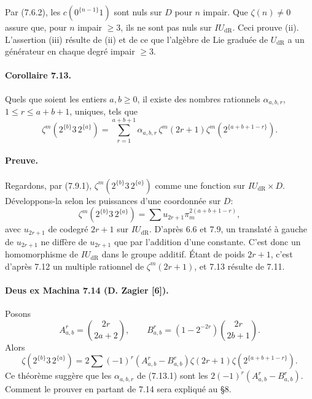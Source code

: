 \documentclass[10pt]{article}
\newcommand{\dR}{\mathrm{dR}}
\begin{document}
Par (7.6.2), les $c(0^{\{n-1\}}1)$ sont nuls sur $D$ pour $n$ impair. Que $\zeta(n)\ne0$ assure que, pour $n$ impair $\geq3$, ils ne sont pas nuls sur $IU_{\dR}$. Ceci prouve (ii). L'assertion (iii) résulte de (ii) et de ce que l'algèbre de Lie graduée de $U_{\dR}$ a un générateur en chaque degré impair $\geq3$.

\paragraph{Corollaire 7.13.}
Quels que soient les entiers $a,b\geq0$, il existe des nombres rationnels $\alpha_{a,b,r}$, $1\leq r\leq a+b+1$, uniques, tels que
\begin{equation}
\zeta^m(2^{\{b\}}3\,2^{\{a\}})=\sum_{r=1}^{a+b+1}\alpha_{a,b,r}\,\zeta^m(2r+1)\zeta^m(2^{\{a+b+1-r\}}).
\tag{7.13.1}
\end{equation}

\paragraph{Preuve.}
Regardons, par (7.9.1), $\zeta^m(2^{\{b\}}3\,2^{\{a\}})$ comme une fonction sur $IU_{\dR}\times D$. Développons-la selon les puissances d'une coordonnée sur $D$:
\[
\zeta^m(2^{\{b\}}3\,2^{\{a\}})=\sum u_{2r+1}\pi_m^{2(a+b+1-r)},
\]
avec $u_{2r+1}$ de codegré $2r+1$ sur $IU_{\dR}$. D'après 6.6 et 7.9, un translaté à gauche de $u_{2r+1}$ ne diffère de $u_{2r+1}$ que par l'addition d'une constante. C'est donc un homomorphisme de $IU_{\dR}$ dans le groupe additif. Étant de poids $2r+1$, c'est d'après 7.12 un multiple rationnel de $\zeta^m(2r+1)$, et 7.13 résulte de 7.11.

\paragraph{Deus ex Machina 7.14 (D. Zagier [6]).}
Posons
\[
A^r_{a,b}=\binom{2r}{2a+2},\qquad
B^r_{a,b}=(1-2^{-2r})\binom{2r}{2b+1}.
\]
Alors
\begin{equation}
\zeta(2^{\{b\}}3\,2^{\{a\}})=2\sum(-1)^r(A^r_{a,b}-B^r_{a,b})\zeta(2r+1)\zeta(2^{\{a+b+1-r\}}).
\tag{7.14.1}
\end{equation}
Ce théorème suggère que les $\alpha_{a,b,r}$ de (7.13.1) sont les $2(-1)^r(A^r_{a,b}-B^r_{a,b})$. Comment le prouver en partant de 7.14 sera expliqué au §8.
\end{document}
